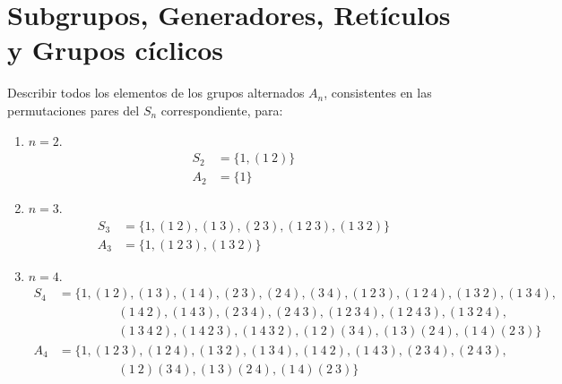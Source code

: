 \chapter{Subgrupos, Generadores, Retículos y Grupos cíclicos}

\begin{ejercicio}\label{ej:3.1}
    Describir todos los elementos de los grupos alternados $A_n$, consistentes en las permutaciones pares del $S_n$ correspondiente, para:
    \begin{enumerate}
        \item $n = 2$.
        \begin{align*}
            S_2 &= \{1, (1\ 2)\}\\
            A_2 &= \{1\}
        \end{align*}
        \item $n = 3$.
        \begin{align*}
            S_3 &= \{1, (1\ 2), (1\ 3), (2\ 3), (1\ 2\ 3), (1\ 3\ 2)\}\\
            A_3 &= \{1, (1\ 2\ 3), (1\ 3\ 2)\}
        \end{align*}
        \item $n = 4$.
        \begin{align*}
            S_4 &= \{1, (1\ 2), (1\ 3), (1\ 4), (2\ 3), (2\ 4), (3\ 4), (1\ 2\ 3), (1\ 2\ 4), (1\ 3\ 2), (1\ 3\ 4),\\&\hspace{2cm} (1\ 4\ 2), (1\ 4\ 3), (2\ 3\ 4), (2\ 4\ 3), (1\ 2\ 3\ 4), (1\ 2\ 4\ 3), (1\ 3\ 2\ 4),\\&\hspace{2cm} (1\ 3\ 4\ 2), (1\ 4\ 2\ 3), (1\ 4\ 3\ 2), (1\ 2)(3\ 4), (1\ 3)(2\ 4), (1\ 4)(2\ 3)\}\\
            A_4 &= \{1, (1\ 2\ 3), (1\ 2\ 4), (1\ 3\ 2), (1\ 3\ 4), (1\ 4\ 2), (1\ 4\ 3), (2\ 3\ 4), (2\ 4\ 3),\\&\hspace{2cm} (1\ 2)(3\ 4), (1\ 3)(2\ 4), (1\ 4)(2\ 3)\}
        \end{align*}
    \end{enumerate}
\end{ejercicio}

